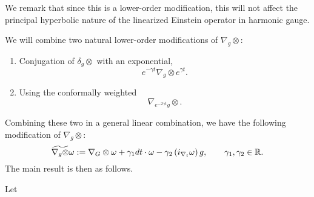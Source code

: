 \documentclass{article}
\begin{document}
We remark that since this is a lower-order modification, this will not
affect the principal hyperbolic nature of the linearized Einstein
operator in harmonic gauge.

We will combine two natural lower-order modifications of $\nabla_g\otimes$:
\begin{enumerate}
\item Conjugation of $\delta_g\otimes$ with an exponential,
  \begin{equation*}
    e^{-\gamma t}\nabla_g\otimes e^{\gamma t}.
  \end{equation*}
\item Using the conformally weighted
  \begin{equation*}
    \nabla_{e^{-2\gamma t}g}\otimes.
  \end{equation*}
\end{enumerate}
Combining these two in a general linear combination, we have the
following modification of $\nabla_g\otimes$:
\begin{equation*}
  \widetilde{\nabla_g\otimes}\omega
  := \nabla_G\otimes\omega
  + \gamma_1 dt\cdot \omega
  - \gamma_2 \left(i_{\nabla_t}\omega\right)g, \qquad
  \gamma_1,\gamma_2 \in \mathbb{R}.
\end{equation*}
The main result is then as follows.
\begin{theorem}
  Let
\end{theorem}
\end{document}
